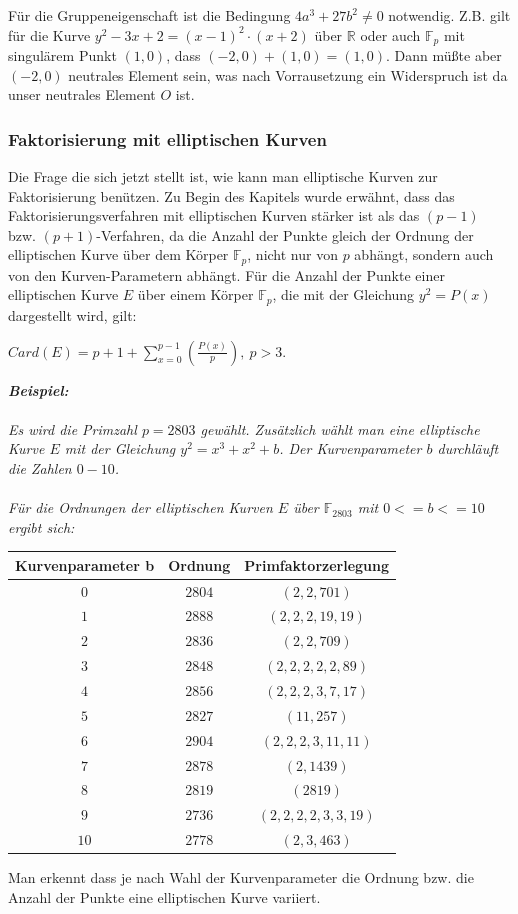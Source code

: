 \documentclass[a4paper,11pt]{article}
\begin{document}
Für die Gruppeneigenschaft ist die Bedingung $4a^3+27b^2 \neq 0$ notwendig. Z.B.
gilt für die Kurve $y^2-3x+2 = (x-1)^2\cdot(x+2)$ über $\mathbb R$ oder auch 
$\mathbb F_p$ mit singulärem Punkt $(1,0)$, dass $(-2,0)+(1,0) = (1,0)$. Dann
müßte aber $(-2,0)$ neutrales Element sein, was nach Vorrausetzung ein 
Widerspruch ist da unser neutrales Element $O$ ist. 

\subsubsection*{Faktorisierung mit elliptischen Kurven}
Die Frage die sich jetzt stellt ist, wie kann man elliptische Kurven zur 
Faktorisierung benützen. Zu Begin des Kapitels wurde erwähnt, dass das 
Faktorisierungsverfahren mit elliptischen Kurven stärker ist als das $(p-1)$
bzw. $(p+1)$-Verfahren, da die Anzahl der Punkte gleich der Ordnung der
elliptischen
Kurve über dem Körper $\mathbb F_p$, nicht nur von $p$ abhängt, sondern auch
von den Kurven-Parametern abhängt. Für die Anzahl der Punkte einer elliptischen 
Kurve $E$ über einem Körper $\mathbb F_p$, die mit der Gleichung $y^2 = P(x)$ 
dargestellt wird, gilt: 
\begin{center}
$Card(E) = p+1+\sum_{x=0}^{p-1}(\frac{P(x)}{p}),\ p>3$.
\end{center}
{\it
\textbf{Beispiel:}\\\\
Es wird die Primzahl $p=2803$ gewählt. Zusätzlich wählt man eine elliptische
Kurve $E$ mit der Gleichung $y^2 = x^3+x^2+b$. Der Kurvenparameter $b$ 
durchläuft die Zahlen $0-10$.\\\\
Für die Ordnungen der elliptischen Kurven $E$ über $\mathbb F_2803$ mit 
$0<=b<=10$ ergibt sich:\\

\begin{center}
\begin{tabular}{|c|c|c|}
\hline
\textbf{Kurvenparameter b} & \textbf{Ordnung} & \textbf{Primfaktorzerlegung}\\
\hline
$0$ & $2804$ & $(2,2,701)$ \\
\hline
$1$ & $2888$ & $(2,2,2,19,19)$ \\
\hline
$2$ & $2836$ & $(2,2,709)$ \\
\hline
$3$ & $2848$ & $(2,2,2,2,2,89)$ \\
\hline
$4$ & $2856$ & $(2,2,2,3,7,17)$ \\
\hline
$5$ & $2827$ & $(11,257)$ \\
\hline
$6$ & $2904$ & $(2,2,2,3,11,11)$ \\
\hline
$7$ & $2878$ & $(2,1439)$ \\
\hline
$8$ & $2819$ & $(2819)$ \\
\hline
$9$ & $2736$ & $(2,2,2,2,3,3,19)$ \\
\hline
$10$ & $2778$ & $(2,3,463)$ \\
\hline
\end{tabular}
\end{center}
Man erkennt dass je nach Wahl der Kurvenparameter die Ordnung bzw. die Anzahl
der Punkte eine elliptischen Kurve variiert.
}\\\\
\end{document}
